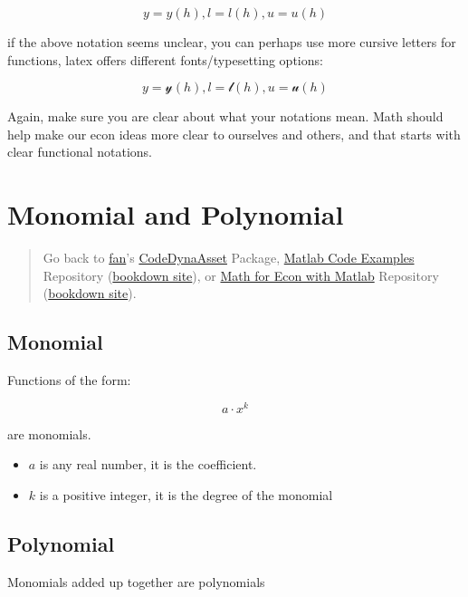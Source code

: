 \documentclass[
]{book}
\begin{document}
\[y=y(h),l=l(h),u=u(h)\]

if the above notation seems unclear, you can perhaps use more cursive
letters for functions, latex offers different fonts/typesetting options:

\[y=\mathcal{y}(h),l=\mathcal{l}(h),u=\mathcal{u}(h)\]

Again, make sure you are clear about what your notations mean. Math
should help make our econ ideas more clear to ourselves and others, and
that starts with clear functional notations.

\hypertarget{monomial-and-polynomial}{%
\section{Monomial and Polynomial}\label{monomial-and-polynomial}}

\begin{quote}
Go back to \href{http://fanwangecon.github.io/}{fan}'s \href{https://fanwangecon.github.io/CodeDynaAsset/}{CodeDynaAsset} Package, \href{https://fanwangecon.github.io/M4Econ/}{Matlab Code Examples} Repository (\href{https://fanwangecon.github.io/M4Econ/bookdown}{bookdown site}), or \href{https://fanwangecon.github.io/Math4Econ/}{Math for Econ with Matlab} Repository (\href{https://fanwangecon.github.io/Math4Econ/bookdown}{bookdown site}).
\end{quote}

\hypertarget{monomial}{%
\subsection{Monomial}\label{monomial}}

Functions of the form:

\[a\cdot x^k\]

are monomials.

\begin{itemize}
\item
  \(a\) is any real number, it is the coefficient.
\item
  \(k\) is a positive integer, it is the degree of the monomial
\end{itemize}

\hypertarget{polynomial}{%
\subsection{Polynomial}\label{polynomial}}

Monomials added up together are polynomials
\end{document}
